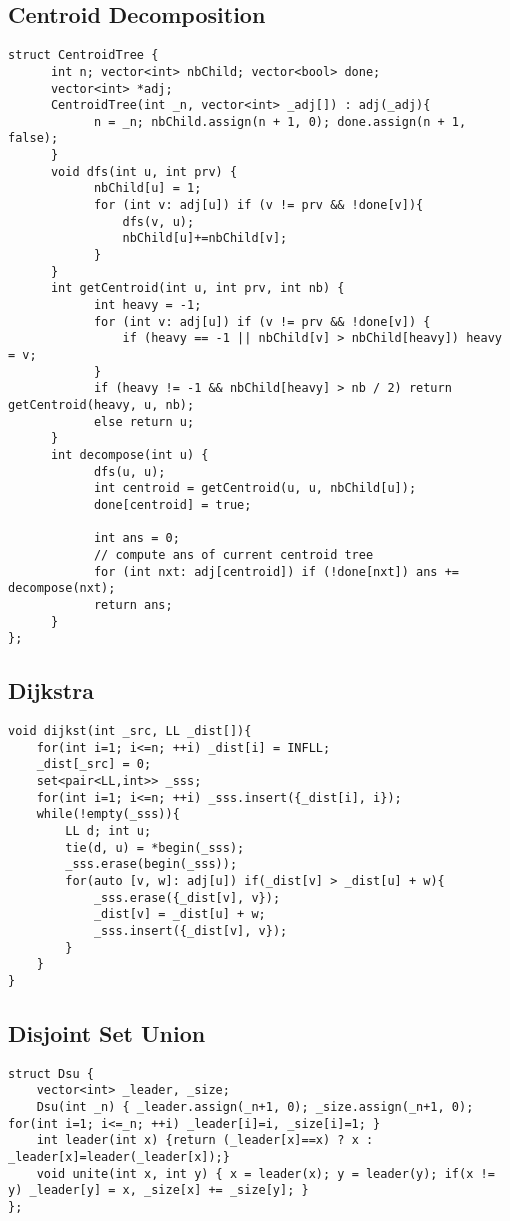 \documentclass[12pt,a4paper,onesided]{article}
\begin{document}
\begin{multicols}{3}
\begin{lstlisting}
\end{lstlisting}



\subsection{Centroid Decomposition}
\begin{lstlisting}
struct CentroidTree {
      int n; vector<int> nbChild; vector<bool> done;
	  vector<int> *adj;
      CentroidTree(int _n, vector<int> _adj[]) : adj(_adj){
            n = _n; nbChild.assign(n + 1, 0); done.assign(n + 1, false);
      }
      void dfs(int u, int prv) {
            nbChild[u] = 1;
            for (int v: adj[u]) if (v != prv && !done[v]){
				dfs(v, u);
				nbChild[u]+=nbChild[v];
			}
      }
      int getCentroid(int u, int prv, int nb) {
            int heavy = -1;
            for (int v: adj[u]) if (v != prv && !done[v]) {
                if (heavy == -1 || nbChild[v] > nbChild[heavy]) heavy = v;
            }
            if (heavy != -1 && nbChild[heavy] > nb / 2) return getCentroid(heavy, u, nb);
            else return u;
      }
      int decompose(int u) {
            dfs(u, u);
            int centroid = getCentroid(u, u, nbChild[u]);
            done[centroid] = true;

            int ans = 0;
			// compute ans of current centroid tree
            for (int nxt: adj[centroid]) if (!done[nxt]) ans += decompose(nxt);
            return ans;
      }
};
\end{lstlisting}



\subsection{Dijkstra}
\begin{lstlisting}
void dijkst(int _src, LL _dist[]){
	for(int i=1; i<=n; ++i) _dist[i] = INFLL;
	_dist[_src] = 0;
	set<pair<LL,int>> _sss;
	for(int i=1; i<=n; ++i) _sss.insert({_dist[i], i});
	while(!empty(_sss)){
		LL d; int u;
		tie(d, u) = *begin(_sss);
		_sss.erase(begin(_sss));
		for(auto [v, w]: adj[u]) if(_dist[v] > _dist[u] + w){
			_sss.erase({_dist[v], v});
			_dist[v] = _dist[u] + w;
			_sss.insert({_dist[v], v});
		}
	}
}
\end{lstlisting}



\subsection{Disjoint Set Union}
\begin{lstlisting}
struct Dsu {
    vector<int> _leader, _size;
    Dsu(int _n) { _leader.assign(_n+1, 0); _size.assign(_n+1, 0); for(int i=1; i<=_n; ++i) _leader[i]=i, _size[i]=1; }
    int leader(int x) {return (_leader[x]==x) ? x : _leader[x]=leader(_leader[x]);}
    void unite(int x, int y) { x = leader(x); y = leader(y); if(x != y) _leader[y] = x, _size[x] += _size[y]; }
};
\end{lstlisting}




\end{multicols}
\end{document}

